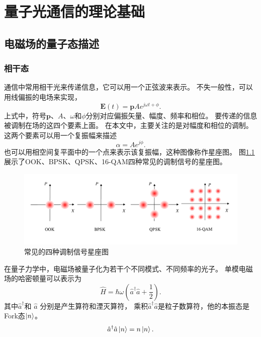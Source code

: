 \chapter{量子光通信的理论基础}

\section{电磁场的量子态描述}
\subsection{相干态}
通信中常用相干光来传递信息，它可以用一个正弦波来表示。
不失一般性，可以用线偏振的电场来实现\cite{djordjevic2010fundamentals}，
\begin{equation}
\bm{E}(t) = \bm{p} A e^{j\omega t + \phi}.
\end{equation}
上式中，符号$\bm{p}$、$A$、$\omega$和$\phi$分别对应偏振矢量、幅度、频率和相位。
要传递的信息被调制在场的这四个要素上面。
在本文中，主要关注的是对幅度和相位的调制。
这两个要素可以用一个复振幅来描述
\begin{equation}
\alpha = A e^{j\phi}.
\end{equation}
也可以用相空间复平面中的一个点来表示该复振幅，这种图像称作星座图。
图\ref{fig:signals}展示了OOK、BPSK、QPSK、16-QAM四种常见的调制信号的星座图。

\begin{figure}
\centering
  \includegraphics[width=\textwidth]{figures/chap2/signals}
  \caption{常见的四种调制信号星座图}
  \label{fig:signals}
\end{figure}

在量子力学中，电磁场被量子化为若干个不同模式、不同频率的光子\cite{gerry2005introductory,helstrom1976quantum,mandel1995optical}。
单模电磁场的哈密顿量可以表示为
\begin{equation}
\hat{H} = \hbar \omega (\hat{a}^\dagger \hat{a} + \frac{1}{2}).
\end{equation}
其中$\hat{a}^\dagger$和 $\hat{a}$ 分别是产生算符和湮灭算符，
乘积$\hat{a}^\dagger \hat{a}$是粒子数算符，他的本振态是Fork态$\ket{n}$。
\begin{equation}
\hat{a}^\dagger \hat{a} \ket{n} = n \ket{n}.
\end{equation}

